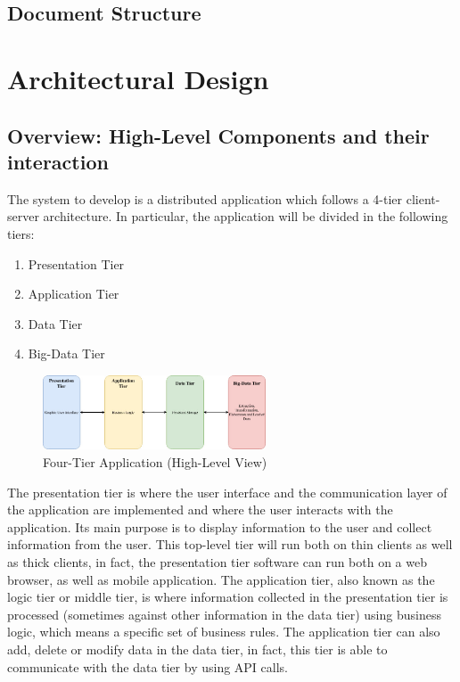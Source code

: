 \documentclass[10pt]{report}
\begin{document}
\section{Document Structure}

\chapter{Architectural Design}
\section{Overview: High-Level Components and their interaction}
The system to develop is a distributed application which follows a 4-tier client-server architecture. In particular, the application will be divided in the following tiers:
\begin{enumerate}
    \item Presentation Tier
    \item Application Tier
    \item Data Tier
    \item Big-Data Tier
\end{enumerate}
\begin{figure}[H]
    \centering
    \includegraphics[width=250px]{Architecture/FourTiers_01.jpg}
    \caption{Four-Tier Application (High-Level View)}
\end{figure}
The presentation tier is where the user interface and the communication layer of the application are implemented and where the user interacts with the application. Its main purpose is to display information to the user and collect information from the user. This top-level tier will run both on thin clients as well as thick clients, in fact, the presentation tier software can run both on a web browser, as well as mobile application.
\newline
\newline
The application tier, also known as the logic tier or middle tier, is where information collected in the presentation tier is processed (sometimes against other information in the data tier) using business logic, which means a specific set of business rules. The application tier can also add, delete or modify data in the data tier, in fact, this tier is able to communicate with the data tier by using API calls.
\end{document}
